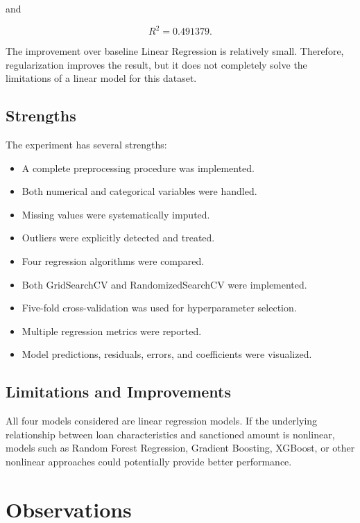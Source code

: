 \documentclass[12pt,a4paper]{article}
\begin{document}
and

\[
R^2=0.491379.
\]

The improvement over baseline Linear Regression is relatively small.
Therefore, regularization improves the result, but it does not completely
solve the limitations of a linear model for this dataset.

\subsection{Strengths}

The experiment has several strengths:

\begin{itemize}
    \item A complete preprocessing procedure was implemented.
    \item Both numerical and categorical variables were handled.
    \item Missing values were systematically imputed.
    \item Outliers were explicitly detected and treated.
    \item Four regression algorithms were compared.
    \item Both GridSearchCV and RandomizedSearchCV were implemented.
    \item Five-fold cross-validation was used for hyperparameter selection.
    \item Multiple regression metrics were reported.
    \item Model predictions, residuals, errors, and coefficients were
    visualized.
\end{itemize}

\subsection{Limitations and Improvements}

All four models considered are linear regression models. If the underlying
relationship between loan characteristics and sanctioned amount is
nonlinear, models such as Random Forest Regression, Gradient Boosting,
XGBoost, or other nonlinear approaches could potentially provide better
performance.


\section{Observations}
\end{document}
